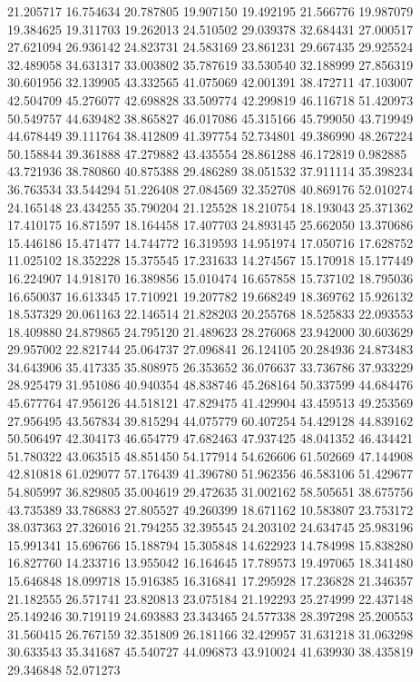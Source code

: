 21.205717
16.754634
20.787805
19.907150
19.492195
21.566776
19.987079
19.384625
19.311703
19.262013
24.510502
29.039378
32.684431
27.000517
27.621094
26.936142
24.823731
24.583169
23.861231
29.667435
29.925524
32.489058
34.631317
33.003802
35.787619
33.530540
32.188999
27.856319
30.601956
32.139905
43.332565
41.075069
42.001391
38.472711
47.103007
42.504709
45.276077
42.698828
33.509774
42.299819
46.116718
51.420973
50.549757
44.639482
38.865827
46.017086
45.315166
45.799050
43.719949
44.678449
39.111764
38.412809
41.397754
52.734801
49.386990
48.267224
50.158844
39.361888
47.279882
43.435554
28.861288
46.172819
0.982885
43.721936
38.780860
40.875388
29.486289
38.051532
37.911114
35.398234
36.763534
33.544294
51.226408
27.084569
32.352708
40.869176
52.010274
24.165148
23.434255
35.790204
21.125528
18.210754
18.193043
25.371362
17.410175
16.871597
18.164458
17.407703
24.893145
25.662050
13.370686
15.446186
15.471477
14.744772
16.319593
14.951974
17.050716
17.628752
11.025102
18.352228
15.375545
17.231633
14.274567
15.170918
15.177449
16.224907
14.918170
16.389856
15.010474
16.657858
15.737102
18.795036
16.650037
16.613345
17.710921
19.207782
19.668249
18.369762
15.926132
18.537329
20.061163
22.146514
21.828203
20.255768
18.525833
22.093553
18.409880
24.879865
24.795120
21.489623
28.276068
23.942000
30.603629
29.957002
22.821744
25.064737
27.096841
26.124105
20.284936
24.873483
34.643906
35.417335
35.808975
26.353652
36.076637
33.736786
37.933229
28.925479
31.951086
40.940354
48.838746
45.268164
50.337599
44.684476
45.677764
47.956126
44.518121
47.829475
41.429904
43.459513
49.253569
27.956495
43.567834
39.815294
44.075779
60.407254
54.429128
44.839162
50.506497
42.304173
46.654779
47.682463
47.937425
48.041352
46.434421
51.780322
43.063515
48.851450
54.177914
54.626606
61.502669
47.144908
42.810818
61.029077
57.176439
41.396780
51.962356
46.583106
51.429677
54.805997
36.829805
35.004619
29.472635
31.002162
58.505651
38.675756
43.735389
33.786883
27.805527
49.260399
18.671162
10.583807
23.753172
38.037363
27.326016
21.794255
32.395545
24.203102
24.634745
25.983196
15.991341
15.696766
15.188794
15.305848
14.622923
14.784998
15.838280
16.827760
14.233716
13.955042
16.164645
17.789573
19.497065
18.341480
15.646848
18.099718
15.916385
16.316841
17.295928
17.236828
21.346357
21.182555
26.571741
23.820813
23.075184
21.192293
25.274999
22.437148
25.149246
30.719119
24.693883
23.343465
24.577338
28.397298
25.200553
31.560415
26.767159
32.351809
26.181166
32.429957
31.631218
31.063298
30.633543
35.341687
45.540727
44.096873
43.910024
41.639930
38.435819
29.346848
52.071273
